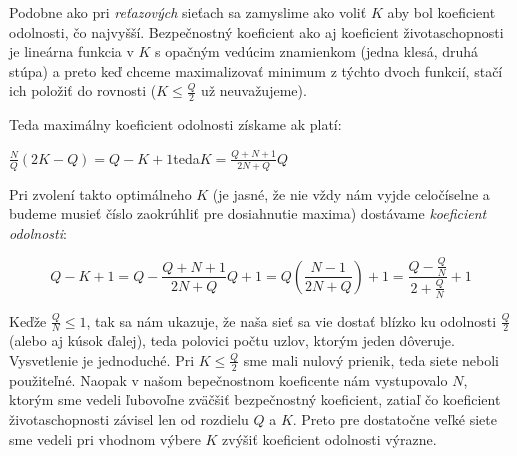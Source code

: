 Podobne ako pri \textit{reťazových} sieťach sa zamyslime ako voliť $K$ aby bol
koeficient odolnosti, čo najvyšší. Bezpečnostný koeficient ako aj koeficient
životaschopnosti je lineárna funkcia v $K$ s opačným vedúcim znamienkom
(jedna klesá, druhá stúpa) a preto keď chceme maximalizovať minimum z týchto
dvoch funkcií, stačí ich položiť do rovnosti ($K\leq\frac{Q}{2}$ už neuvažujeme).

Teda maximálny koeficient odolnosti získame ak platí:

\centerline{$\frac{N}{Q}(2K-Q)=Q-K+1$\hspace{10mm}teda\hspace{10mm}$K=\frac{Q+N+1}{2N+Q}Q$}

Pri zvolení takto optimálneho $K$ (je jasné, že nie vždy nám vyjde celočíselne a budeme
musieť číslo zaokrúhliť pre dosiahnutie maxima) dostávame \textit{koeficient odolnosti}:

$$Q-K+1=Q-\frac{Q+N+1}{2N+Q}Q+1=Q(\frac{N-1}{2N+Q})+1=\frac{Q-\frac{Q}{N}}{2+\frac{Q}{N}}+1$$

Keďže $\frac{Q}{N}\leq 1$, tak sa nám ukazuje, že naša sieť sa vie dostať blízko ku odolnosti
$\frac{Q}{2}$ (alebo aj kúsok ďalej), teda polovici počtu uzlov, ktorým jeden dôveruje.
Vysvetlenie je jednoduché. Pri $K\leq\frac{Q}{2}$ sme mali nulový prienik, teda siete neboli
použiteľné. Naopak v našom bepečnostnom koeficente nám vystupovalo $N$, ktorým sme vedeli
ľubovoľne zväčšiť bezpečnostný koeficient, zatiaľ čo koeficient životaschopnosti
závisel len od rozdielu $Q$ a $K$. Preto pre dostatočne veľké siete sme vedeli pri vhodnom
výbere $K$ zvýšiť koeficient odolnosti výrazne.